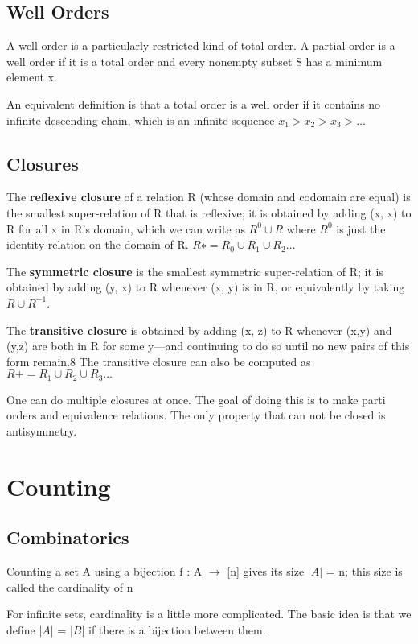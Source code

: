 \documentclass[twoside]{article}
\begin{document}
\subsection{Well Orders}

A well order is a particularly restricted kind of total order. A partial order is a well order if it is a total order and every nonempty subset S has a minimum element x.

An equivalent definition is that a total order is a well order if it contains no infinite descending chain, which is an infinite sequence $x_1 > x_2 > x_3 > \ldots$


\subsection{Closures}

The \textbf{reflexive closure} of a relation R (whose domain and codomain are equal) is the smallest super-relation of R that is reflexive; it is obtained by adding (x, x) to R for all x in R’s domain, which we can write as $R^0 \cup R$ where $R^0$ is just the identity relation on the domain of R. $R∗ =R_0 \cup R_1 \cup R_2 \ldots$

The \textbf{symmetric closure} is the smallest symmetric super-relation of R; it is obtained by adding (y, x) to R whenever (x, y) is in R, or equivalently by taking $R \cup R^{-1}$.

The \textbf{transitive closure} is obtained by adding (x, z) to R whenever (x,y) and (y,z) are both in R for some y—and continuing to do so until no new pairs of this form remain.8 The transitive closure can also be computed as $R+ = R_1 \cup R_2 \cup R_3 \ldots$

One can do multiple closures at once. The goal of doing this is to make parti orders 
and equivalence relations. The only property that can not be closed is antisymmetry. 


\section{Counting}

\subsection{Combinatorics}
Counting a set A using a bijection f : A $\rightarrow$ [n] gives its size $|A|$ = n; this size is called the cardinality of n

For infinite sets, cardinality is a little more complicated. The basic idea is that we define $|A|$ = $|B|$ if there is a bijection between them.
\end{document}
